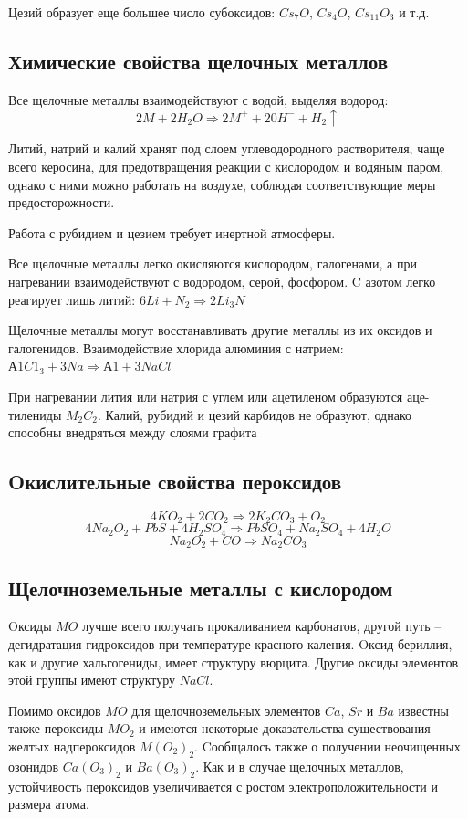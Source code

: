 \documentclass[11pt]{article}
\begin{document}
Цезий образует еще большее число субоксидов: $Cs_7O$, $Cs_4O$, $Cs_{11}O_3$ и т.д.

\subsection{Химические свойства щелочных металлов}

Все щелочные металлы взаимодействуют с водой, выделяя водород:
$$2M + 2H_2O \Rightarrow 2M^+ + 20H^- + H_2 \uparrow$$

Литий, натрий и калий хранят под слоем углеводородного растворителя, чаще
всего керосина, для предотвращения реакции с кислородом и водяным паром, однако с
ними можно работать на воздухе, соблюдая соответствующие меры предосторожности.

Работа с рубидием и цезием требует инертной атмосферы.

Все щелочные металлы легко окисляются кислородом, галогенами, а при
нагревании взаимодействуют с водородом, серой, фосфором. C азотом легко реагирует
лишь литий:
$6Li + N_2 \Rightarrow 2Li_3N$

Щелочные металлы могут восстанавливать другие металлы из их оксидов и
галогенидов. Взаимодействие хлорида алюминия с натрием:
$А1C1_3 + 3Na \Rightarrow А1 + 3NaCl$

При нагревании лития или натрия с углем или ацетиленом образуются аце-
тилениды $M_2C_2$. Калий, рубидий и цезий карбидов не образуют, однако способны внедряться между слоями графита

\subsection{Oкислительные свойства пероксидов}
$$4KO_2 + 2CO_2 \Rightarrow 2K_2CO_3 + O_2$$
$$4Na_2O_2 + PbS + 4H_2SO_4 \Rightarrow PbSO_4 + Na_2SO_4 + 4H_2O$$
$$Na_2O_2 + CO \Rightarrow Na_2CO_3$$

\subsection{Щелочноземельные металлы с кислородом}

Oксиды $MO$ лучше всего получать прокаливанием карбонатов, другой путь –
дегидратация гидроксидов при температуре красного каления. Oксид бериллия, как и
другие хальгогениды, имеет структуру вюрцита. Другие оксиды элементов этой группы
имеют структуру $NaCl$.

Помимо оксидов $MO$ для щелочноземельных элементов $Ca$, $Sr$ и $Ba$ известны также
пероксиды $MO_2$ и имеются некоторые доказательства существования желтых
надпероксидов $M(O_2)_2$. Cообщалось также о получении неочищенных озонидов $Ca(O_3)_2$ и
$Ba(O_3)_2$. Как и в случае щелочных металлов, устойчивость пероксидов увеличивается с
ростом электроположительности и размера атома. 
\end{document}
